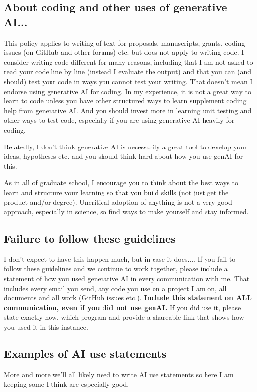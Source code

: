 \documentclass[11pt]{article}
\begin{document}
\subsection*{About coding and other uses of generative AI...} 

This policy applies to writing of text for proposals, manuscripts, grants, coding issues (on GitHub and other forums) etc. but does not apply to writing code. I consider writing code different for many reasons, including that I am not asked to read your code line by line (instead I evaluate the output) and that you can (and should) test your code in ways you cannot test your writing. That doesn't mean I endorse using generative AI for coding. In my experience, it is not a great way to learn to code unless you have other structured ways to learn supplement coding help from generative AI. And you should invest more in learning unit testing and other ways to test code, especially if you are using generative AI heavily for coding. 

Relatedly, I don't think generative AI is necessarily a great tool to develop your ideas, hypotheses etc. and you should think hard about how you use genAI for this. 

As in all of graduate school, I encourage you to think about the best ways to learn and structure your learning so that you build skills (not just get the product and/or degree). Uncritical adoption of anything is not a very good approach, especially in science, so find ways to make yourself and stay informed. 


\subsection*{Failure to follow these guidelines}
I don't expect to have this happen much, but in case it does....
If you fail to follow these guidelines and we continue to work together, please include a statement of how you used generative AI in every communication with me. That includes every email you send, any code you use on a project I am on, all documents and all work (GitHub issues etc.). {\bf Include this statement on ALL communication, even if you did not use genAI.} If you did use it, please state exactly how, which program and provide a shareable link that shows how you used it in this instance. 


\subsection*{Examples of AI use statements} 
More and more we'll all likely need to write AI use statements so here I am keeping some I think are especially good. 
\end{document}
